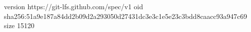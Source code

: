 version https://git-lfs.github.com/spec/v1
oid sha256:51a9e187a84dd2b09d2a293050d27431dc3e3c1e5e23c3bdd8caacc93a947c69
size 15120
